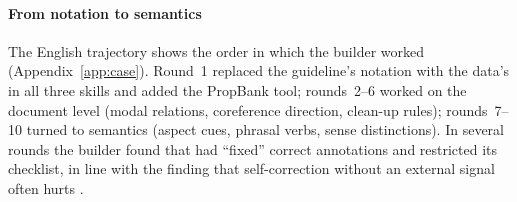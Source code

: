 \paragraph{From notation to semantics} The English trajectory shows the order in which the builder worked (Appendix~\ref{app:case}). Round~1 replaced the guideline's notation with the data's in all three skills and added the PropBank tool; rounds~2--6 worked on the document level (modal relations, coreference direction, clean-up rules); rounds~7--10 turned to semantics (aspect cues, phrasal verbs, sense distinctions). In several rounds the builder found that  had ``fixed'' correct annotations and restricted its checklist, in line with the finding that self-correction without an external signal often hurts \citep{huang2024large,kamoi2024when}.
\label{sec:case}
